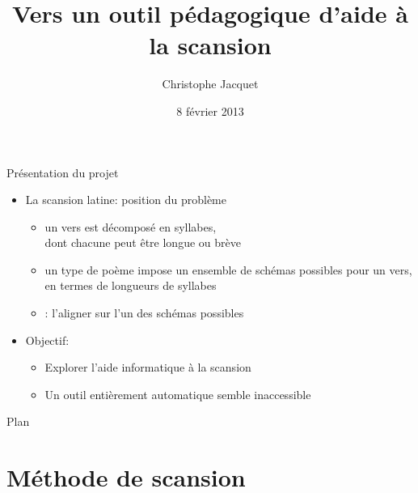 \documentclass{beamer}
\title{Vers un outil pédagogique d'aide à la scansion}
\author{Christophe Jacquet}
\date{8 février 2013}
\begin{document}
\maketitle


\begin{frame}{Présentation du projet}

\begin{itemize}
\item La scansion latine: position du problème

\begin{itemize}
\item un vers est décomposé en syllabes,\\ dont chacune peut être longue ou brève
\item un type de poème impose un ensemble de schémas possibles pour un vers, en termes de longueurs de syllabes
\item {}: l'aligner sur l'un des schémas possibles
\end{itemize}

\vfill

\item Objectif:

\begin{itemize}
\item Explorer l'aide informatique à la scansion
\item Un outil entièrement automatique semble inaccessible
\end{itemize}

\end{itemize}

\end{frame} %


\begin{frame}{Plan}

\tableofcontents

\end{frame} %


\section{Méthode de scansion}
\end{document}

